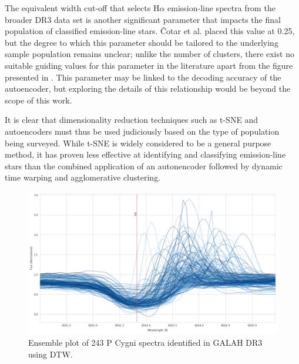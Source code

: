 The equivalent width cut-off that selects H$\alpha$ emission-line spectra from the broader DR3 data set is another significant parameter that impacts the final population of classified emission-line stars. \v{C}otar et al. placed this value at 0.25, but the degree to which this parameter should be tailored to the underlying sample population remains unclear; unlike the number of clusters, there exist no suitable guiding values for this parameter in the literature apart from the figure presented in \citet{vcotar2021galah}. This parameter may be linked to the decoding accuracy of the autoencoder, but exploring the details of this relationship would be beyond the scope of this work.

It is clear that dimensionality reduction techniques such as t-SNE and autoencoders must thus be used judiciously based on the type of population being surveyed. While t-SNE is widely considered to be a general purpose method, it has proven less effective at identifying and classifying emission-line stars than the combined application of an autonencoder followed by dynamic time warping and agglomerative clustering. 

\begin{figure}[!htb]
\centering
\includegraphics[scale=0.45]{figures/p cygni ensemble.png}
\caption{Ensemble plot of 243 P Cygni spectra identified in GALAH DR3 using DTW.}
\end{figure}

